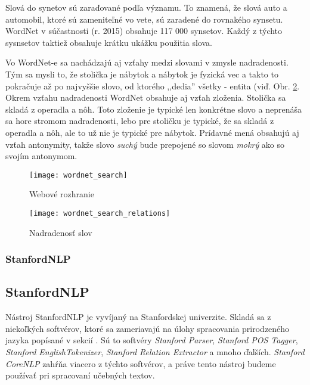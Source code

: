Slová do synetov sú zaraďované podľa významu. To znamená, že slová auto a automobil, ktoré sú zameniteľné vo vete, sú zaradené do rovnakého synsetu. WordNet v súčastnosti (r. 2015) obsahuje 117 000 synsetov. Každý z týchto sysnsetov taktiež obsahuje krátku ukážku použitia slova.

Vo WordNet-e sa nachádzajú aj vzťahy medzi slovami v zmysle nadradenosti. Tým sa mysli to, že stolička je nábytok a nábytok je fyzická vec a takto to pokračuje až po najvyššie slovo, od ktorého ,,dedia'' všetky - entita (viď. Obr.  \ref{fig:wordnet_relations}. Okrem vzťahu nadradenosti WordNet obsahuje aj vzťah zloženia. Stolička sa skladá z operadla a nôh. Toto zloženie je typické len konkrétne slovo a neprenáša sa hore stromom nadradenosti,   lebo pre stoličku je typické, že sa skladá z operadla a nôh, ale to už nie je typické pre nábytok.
Prídavné mená obsahujú aj vzťah antonymity, takže slovo \textit{suchý} bude prepojené so slovom \textit{mokrý} ako so svojím antonymom.

\begin{figure}[H]
\begin{center}\texttt{[image: wordnet\_search]}\end{center}
\caption[Webové rozhranie]{Webové rozhranie}\label{fig:wordnet_search}
\end{figure}

\begin{figure}[H]
\begin{center}\texttt{[image: wordnet\_search\_relations]}\end{center}
\caption[Nadradenosť slov]{Nadradenosť slov}\label{fig:wordnet_relations}
\end{figure}

%
%
{
	\subsubsection{StanfordNLP}
}
{
	\subsection{StanfordNLP}
}
\label{subsubsec:stanfordnlp}
Nástroj StanfordNLP je vyvíjaný na Stanfordskej univerzite. Skladá sa z niekoľkých softvérov, ktoré sa zameriavajú na úlohy spracovania prirodzeného jazyka popísané v sekcií . Sú to softvéry \textit{Stanford Parser}, \textit{Stanford POS Tagger}, \textit{Stanford EnglishTokenizer}, \textit{Stanford Relation Extractor} a mnoho ďalších. \textit{Stanford CoreNLP} zahŕňa viacero z týchto softvérov, a práve tento nástroj budeme používať pri spracovaní učebných textov.

